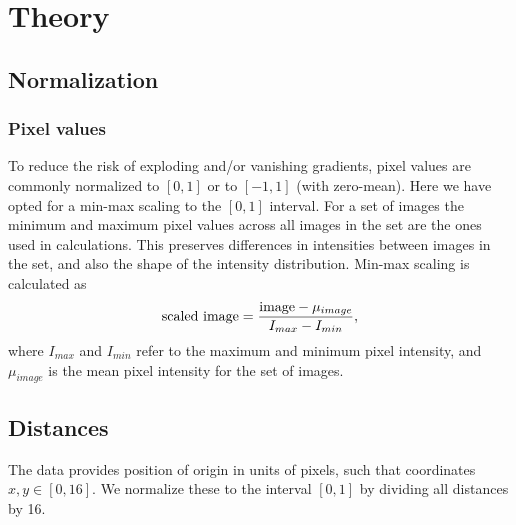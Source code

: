 \section{Theory}
\subsection{Normalization}
\subsubsection{Pixel values}
To reduce the risk of exploding and/or vanishing gradients, pixel values are 
commonly normalized to $[0, 1]$ or to $[-1, 1]$ (with zero-mean). 
Here we have opted for a min-max scaling to the $[0, 1]$ interval.
For a set of images the minimum and maximum pixel values across all images
in the set are the ones used in calculations. This preserves differences in
intensities between images in the set, and also the shape of the intensity 
distribution. Min-max scaling is calculated as
\begin{equation}
    \text{scaled image} = \frac{\text{image} - \mu_{image}}{I_{max} - I_{min}},
\end{equation}
where $I_{max}$ and $I_{min}$ refer to the maximum and minimum pixel intensity,
and $\mu_{image}$ is the mean pixel intensity for the set of images.

\subsection{Distances}
The data provides position of origin in units of pixels, such that coordinates
$x,y \in [0,16]$. We normalize these to the interval $[0,1]$ by dividing all
distances by 16.
